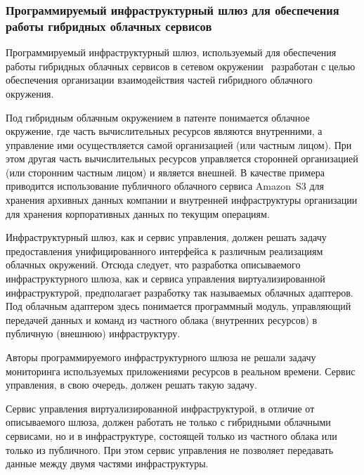 \subsubsection*{Программируемый инфраструктурный шлюз для обеспечения работы гибридных облачных сервисов}
Программируемый инфраструктурный шлюз, используемый для обеспечения работы гибридных облачных сервисов в сетевом окружении~\cite{programmable-infrastructure-gateway} разработан с целью обеспечения организации взаимодействия частей гибридного облачного окружения.

Под гибридным облачным окружением в патенте понимается облачное окружение, где часть вычислительных ресурсов являются внутренними, а управление ими осуществляется самой организацией (или частным лицом). 
При этом другая часть вычислительных ресурсов управляется сторонней организацией (или сторонним частным лицом) и является внешней. 
В качестве примера приводится использование публичного облачного сервиса Amazon~S3\textsuperscript{\texttrademark} для хранения архивных данных компании и внутренней инфраструктуры организации для хранения корпоративных данных по текущим операциям.

Инфраструктурный шлюз, как и сервис управления, должен решать задачу предоставления унифицированного интерфейса к различным реализациям облачных окружений. 
Отсюда следует, что разработка описываемого инфраструктурного шлюза, как и сервиса управления виртуализированной инфраструктурой, предполагает разработку так называемых облачных адаптеров. 
Под облачным адаптером здесь понимается программный модуль, управляющий передачей данных и команд из частного облака (внутренних ресурсов) в  публичную (внешнюю) инфраструктуру.

Авторы программируемого инфраструктурного шлюза не решали задачу мониторинга используемых приложениями ресурсов в реальном времени. 
Сервис управления, в свою очередь, должен решать такую задачу.

Сервис управления виртуализированной инфраструктурой, в отличие от описываемого шлюза, должен работать не только с гибридными облачными сервисами, но и в инфраструктуре, состоящей только из частного облака или только из публичного.
При этом сервис управления не позволяет передавать данные между двумя частями инфраструктуры.